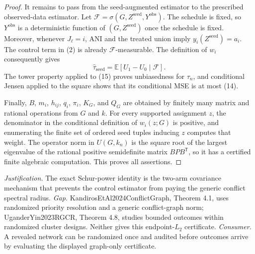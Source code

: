 \documentclass{article}
\begin{document}
\begin{proof}
It remains to pass from the seed-augmented estimator to the prescribed
observed-data estimator.  Let
\(\mathcal F=\sigma(G,Z^{\mathrm{seed}},Y^{\mathrm{obs}})\).  The schedule
is fixed, so \(Y^{\mathrm{obs}}\) is a deterministic function of
\((G,Z^{\mathrm{seed}})\) once the schedule is fixed.  Moreover, whenever
\(J_\ell=i\), ANI and the treated union imply
\(y_i(Z^{\mathrm{seed}})=a_i\).  The control term in (2) is already
\(\mathcal F\)-measurable.  The definition of \(w_i\) consequently gives
\[
\widehat\tau_{\mathrm{seed}}
=\mathbb E[U_1-U_0\mid\mathcal F].
\tag{15}
\]
The tower property applied to (15) proves unbiasedness for \(\tau_n\), and
conditional Jensen applied to the square shows that its conditional MSE is
at most (14).

Finally, \(B\), \(m_i\), \(h_{ij}\), \(q_i\), \(\pi_i\), \(K_G\), and
\(Q_G\) are obtained by finitely many matrix and rational operations from
\(G\) and \(k\).  For every supported assignment \(z\), the denominator in
the conditional definition of \(w_i(z;G)\) is positive, and enumerating the
finite set of ordered seed tuples inducing \(z\) computes that weight.
The operator norm in \(U(G,k_n)\) is the square root of the largest
eigenvalue of the rational positive semidefinite matrix
\(BPB^{\mathsf T}\), so it has a certified finite algebraic computation.
This proves all assertions.
\end{proof}
\par\smallskip\noindent \textit{Justification.} The exact Schur-power identity is the two-arm covariance mechanism that prevents the control estimator from paying the generic conflict spectral radius. \textit{Gap.} KandirosEtAl2024ConflictGraph, Theorem 4.1, uses randomized priority resolution and a generic conflict-graph norm; UganderYin2023RGCR, Theorem 4.8, studies bounded outcomes within randomized cluster designs. Neither gives this endpoint-\(L_2\) certificate. \textit{Consumer.} A revealed network can be randomized once and audited before outcomes arrive by evaluating the displayed graph-only certificate.
\end{document}
